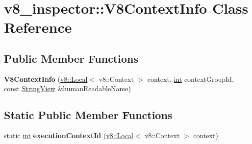\hypertarget{classv8__inspector_1_1V8ContextInfo}{}\section{v8\+\_\+inspector\+:\+:V8\+Context\+Info Class Reference}
\label{classv8__inspector_1_1V8ContextInfo}
\subsection*{Public Member Functions}
\begin{DoxyCompactItemize}
\item 
\mbox{\label{classv8__inspector_1_1V8ContextInfo_a820147b336211cd5fef928151bd143c4}} 
{\bfseries V8\+Context\+Info} (\mbox{\hyperlink{classv8_1_1Local}{v8\+::\+Local}}$<$ v8\+::\+Context $>$ context, \mbox{\hyperlink{classint}{int}} context\+Group\+Id, const \mbox{\hyperlink{classv8__inspector_1_1StringView}{String\+View}} \&human\+Readable\+Name)
\end{DoxyCompactItemize}
\subsection*{Static Public Member Functions}
\begin{DoxyCompactItemize}
\item 
\mbox{\label{classv8__inspector_1_1V8ContextInfo_aa5aeb05d5687bc39a2864d816f31f916}} 
static \mbox{\hyperlink{classint}{int}} {\bfseries execution\+Context\+Id} (\mbox{\hyperlink{classv8_1_1Local}{v8\+::\+Local}}$<$ v8\+::\+Context $>$ context)
\end{DoxyCompactItemize}
